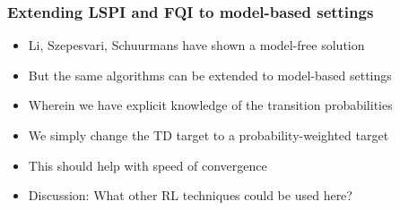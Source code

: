 \documentclass[handout]{beamer}
\begin{document}
\begin{frame}
\frametitle{Extending LSPI and FQI to model-based settings}
\pause
\begin{itemize}[<+->]
\item Li, Szepesvari, Schuurmans have shown a model-free solution
\item But the same algorithms can be extended to model-based settings
\item Wherein we have explicit knowledge of the transition probabilities
\item We simply change the TD target to a probability-weighted target
\item This should help with speed of convergence
\item Discussion: What other RL techniques could be used here? 
\end{itemize}
\end{frame}
\end{document}
